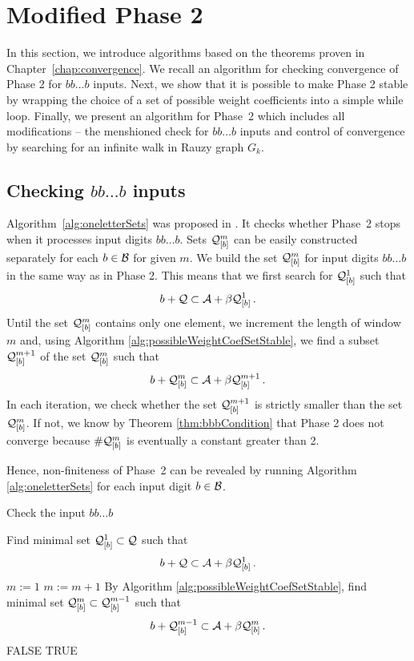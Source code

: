 \section{Modified Phase 2}
\label{sec:modifiedPhase2}

In this section, we introduce algorithms based on the theorems proven in Chapter~\ref{chap:convergence}. We recall an algorithm for checking convergence of Phase 2 for $bb\dots b$ inputs. Next, we show that it is possible to make Phase 2 stable by wrapping the choice of a set of possible weight coefficients into a simple while loop. Finally, we present an algorithm for Phase~2 which includes all modifications -- the menshioned check for $bb\dots b$ inputs and control of convergence by searching for an infinite walk in Rauzy graph $G_k$.

\subsection*{Checking $bb\dots b$ inputs}

Algorithm~\ref{alg:oneletterSets} was proposed in \cite{vu}. It checks whether Phase~2 stops when it processes input digits $bb\dots b$.
Sets $\mathcal{Q}_{[\scriptstyle b]}^{\scriptstyle m}$  can be easily constructed separately for each $b\in\mathcal{B}$ for given $m$. We build the set $\mathcal{Q}_{[\scriptstyle b]}^{\scriptstyle m}$ for input digits $bb\dots b$ in the same way as in Phase 2. This means that we first search for $\mathcal{Q}_{[\scriptstyle b]}^{\scriptstyle 1}$ such that 
$$
b + \mathcal{Q} \subset \mathcal{A} + \beta \mathcal{Q}_{[\scriptstyle b]}^{\scriptstyle 1}\,.
$$
Until the set $\mathcal{Q}_{[\scriptstyle b]}^{\scriptstyle m}$ contains only one element, we increment the length of  window $m$ and, using Algorithm \ref{alg:possibleWeightCoefSetStable}, we find a subset $\mathcal{Q}_{[\scriptstyle b]}^{\scriptstyle m+1}$ of the set $\mathcal{Q}_{[\scriptstyle b]}^{\scriptstyle m}$ such that
$$
b + \mathcal{Q}_{[\scriptstyle b]}^{\scriptstyle m} \subset \mathcal{A} + \beta \mathcal{Q}_{[\scriptstyle b]}^{\scriptstyle m+1}\,.
$$
In each iteration, we check whether the set $\mathcal{Q}_{[\scriptstyle b]}^{\scriptstyle m+1}$ is strictly smaller than the set $\mathcal{Q}_{[\scriptstyle b]}^{\scriptstyle m}$. If not, we know by Theorem \ref{thm:bbbCondition} that Phase 2 does not converge because $\#\mathcal{Q}_{[\scriptstyle b]}^{\scriptstyle m}$ is eventually a constant greater than 2.

Hence, non-finiteness of Phase~2 can be revealed by running Algorithm \ref{alg:oneletterSets} for each input digit $b\in\mathcal{B}$.
\begin{algorithm}
  \caption{Check the input $bb\dots b$}
    \label{alg:oneletterSets}
  \begin{algorithmic}[1]
    \STATE Find minimal set $\mathcal{Q}_{[\scriptstyle b]}^{\scriptstyle 1} \subset \mathcal{Q}$ such that
      $$
      b + \mathcal{Q} \subset \mathcal{A} + \beta \mathcal{Q}_{[\scriptstyle b]}^{\scriptstyle 1}\,.
      $$
      \vspace{-20pt}
    \STATE $m:=1$
        \STATE $m:= m +1$
        \STATE By Algorithm \ref{alg:possibleWeightCoefSetStable}, find minimal set $\mathcal{Q}_{[\scriptstyle b]}^{\scriptstyle m} \subset \mathcal{Q}_{[\scriptstyle b]}^{\scriptstyle m-1}$ such that
          $$
          b + \mathcal{Q}_{[\scriptstyle b]}^{\scriptstyle m-1} \subset \mathcal{A} + \beta \mathcal{Q}_{[\scriptstyle b]}^{\scriptstyle m}\,.
          $$  
          \vspace{-20pt}
            \RETURN FALSE
        \ENDIF
    \ENDWHILE  
    \RETURN TRUE
  \end{algorithmic}
\end{algorithm}


